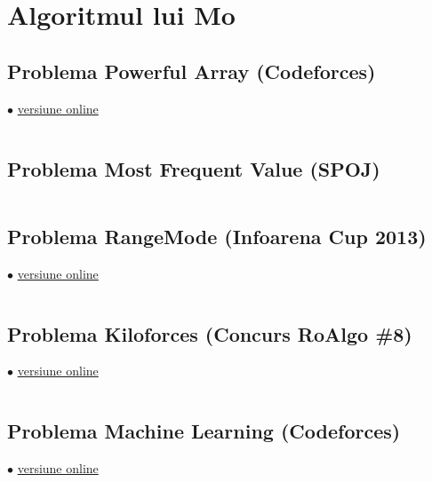 \documentclass[../main.tex]{subfiles}
\begin{document}
\chapter{Algoritmul lui Mo}

\section{Problema Powerful Array (Codeforces)}
\label{code:powerful-array}
$\bullet$
\href{https://codeforces.com/contest/86/submission/282628121}{versiune online}

\inputminted{cpp}{../src/mo/powerful-array.cpp}

\section{Problema Most Frequent Value (SPOJ)}
\label{code:most-frequent-value}

\inputminted{cpp}{../src/mo/most-frequent-value.cpp}

\section{Problema RangeMode (Infoarena Cup 2013)}
\label{code:rangemode}
$\bullet$
\href{https://www.infoarena.ro/job_detail/3244261?action=view-source}{versiune online}

\inputminted{cpp}{../src/mo/rangemode.cpp}

\section{Problema Kiloforces (Concurs RoAlgo \#8)}
\label{code:kiloforces}
$\bullet$
\href{https://kilonova.ro/submissions/819170}{versiune online}

\inputminted{cpp}{../src/mo/kiloforces.cpp}

\section{Problema Machine Learning (Codeforces)}
\label{code:machine-learning}
$\bullet$
\href{https://codeforces.com/contest/940/submission/348487409}{versiune online}

\inputminted{cpp}{../src/mo/machine-learning.cpp}
\end{document}
